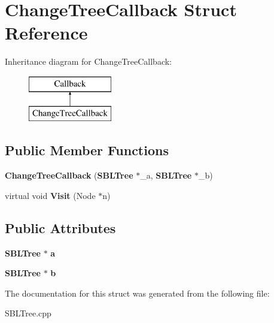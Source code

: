\section{Change\+Tree\+Callback Struct Reference}
\label{structChangeTreeCallback}
Inheritance diagram for Change\+Tree\+Callback\+:\begin{figure}[H]
\begin{center}
\leavevmode
\includegraphics[height=2.000000cm]{structChangeTreeCallback}
\end{center}
\end{figure}
\subsection*{Public Member Functions}
\begin{DoxyCompactItemize}
\item 
{\bfseries Change\+Tree\+Callback} ({\bf S\+B\+L\+Tree} $\ast$\+\_\+a, {\bf S\+B\+L\+Tree} $\ast$\+\_\+b)\label{structChangeTreeCallback_a53d4348299a01338af878e0ccd953d0c}

\item 
virtual void {\bfseries Visit} (Node $\ast$n)\label{structChangeTreeCallback_a3d879482b10c711be3457b69c7338fb4}

\end{DoxyCompactItemize}
\subsection*{Public Attributes}
\begin{DoxyCompactItemize}
\item 
{\bf S\+B\+L\+Tree} $\ast$ {\bfseries a}\label{structChangeTreeCallback_ad9f79b61d010e58f6a781f733770e0e2}

\item 
{\bf S\+B\+L\+Tree} $\ast$ {\bfseries b}\label{structChangeTreeCallback_a95d015b3ab0b0ebd381496992364afc6}

\end{DoxyCompactItemize}


The documentation for this struct was generated from the following file\+:\begin{DoxyCompactItemize}
\item 
S\+B\+L\+Tree.\+cpp\end{DoxyCompactItemize}
